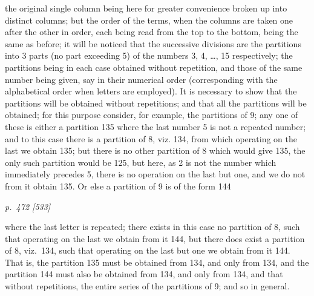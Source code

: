 \documentclass[11pt,a4paper]{book}
\begin{document}
the original single column being here for greater convenience broken up into distinct
columns; but the order of the terms, when the columns are taken one after the other
in order, each being read from the top to the bottom, being the same as before; it
will be noticed that the successive divisions are the partitions into 3 parts (no part
exceeding 5) of the numbers 3, 4, \ldots, 15 respectively; the partitions being in each
case obtained without repetition, and those of the same number being given, say in
their numerical order (corresponding with the alphabetical order when letters are
employed). It is necessary to show that the partitions will be obtained without
repetitions; and that all the partitions will be obtained; for this purpose consider, for
example, the partitions of 9; any one of these is either a partition 135 where the last
number 5 is not a repeated number; and to this case there is a partition of 8, viz.
134, from which operating on the last we obtain 135; but there is no other partition
of 8 which would give 135, the only such partition would be 125, but here, as 2 is
not the number which immediately precedes 5, there is no operation on the last but
one, and we do not from it obtain 135. Or else a partition of 9 is of the form 144

\clearpage

\bigskip
\textit{p.~472 [533]}
\smallskip

\noindent
where the last letter is repeated; there exists in this case no partition of 8, such
that operating on the last we obtain from it 144, but there does exist a partition
of 8, viz.\ 134, such that operating on the last but one we obtain from it 144. That
is, the partition 135 must be obtained from 134, and only from 134, and the partition
144 must also be obtained from 134, and only from 134, and that without repetitions, the entire series
of the partitions of 9; and so in general.
\end{document}
